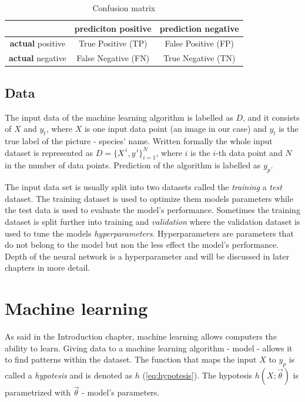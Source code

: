 \documentclass[times, utf8, diplomski]{fer}
\begin{document}
\begin{table}
\centering
\caption{Confusion matrix}
\label{tb:confusion_matrix}
\begin{tabular}{|c|c|c|}
\hline 
 & \textbf{prediciton} positive & \textbf{prediction} negative \\ 
\hline 
\textbf{actual} positive & True Positive (TP) & False Positive (FP) \\ 
\hline 
\textbf{actual} negative & False Negative (FN) & True Negative (TN) \\ 
\hline 
\end{tabular}
\end{table}

\subsection{Data} \label{se:data}
The input data of the machine learning algorithm is labelled as $D$, and it consists of $X$ and $y_{t}$, where $X$ is one input data point (an image in our case) and $y_{t}$ is the true label of the picture - species' name. Written formally the whole input dataset is represented as $D = \{{X}^{\,i},y^{\,i}\}^{N}_{i=1}$, where $i$ is the $i$-th data point and $N$ in the number of data points. Prediction of the algorithm is labelled as $y_{p}$.

The input data set is usually split into two datasets called the \textit{training} a \textit{test} dataset. The training dataset is used to optimize them models parameters while the test data is used to evaluate the model's performance. Sometimes the training dataset is split further into training and \textit{validation} where the validation dataset is used to tune the models \textit{hyperparameters}. Hyperparameters are parameters that do not belong to the model but non the less effect the model's performance. Depth of the neural network is a hyperparameter and will be discussed in later chapters in more detail.


\section{Machine learning}
\label{se:machine_learning}

As said in the Introduction chapter, machine learning allows computers the ability to learn. Giving data to a machine learning algorithm - model - allows it to find patterns within the dataset. The function that maps the input $X$ to $y_p$ is called a \textit{hypotesis} and is denoted as $h$ (\ref{eq:hypotesis}). The hypotesis $h(X ; \vec{\theta})$ is parametrized with $\vec{\theta}$ - model's parameters.
\end{document}
